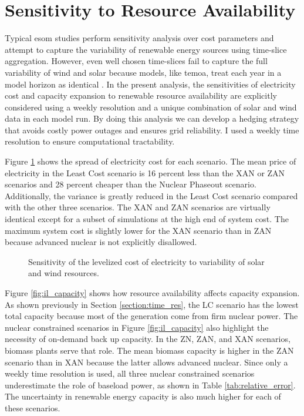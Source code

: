\section{Sensitivity to Resource Availability}
\label{section:resource_sa}

Typical \gls{esom} studies perform sensitivity analysis over cost parameters and
attempt to capture the variability of renewable energy sources using time-slice
aggregation. However, even well chosen time-slices fail to capture the full variability
of wind and solar because models, like \gls{temoa}, treat each year in a model
horizon as identical \cite{hunter_modeling_2013}. In the present analysis, the
sensitivities of electricity cost and capacity expansion to renewable resource
availability are explicitly considered using a weekly resolution and a unique combination
of solar and wind data in each model run. By doing this analysis we can develop
a hedging strategy that avoids costly power outages and ensures grid reliability.
I used a weekly time resolution to ensure computational tractability.

Figure \ref{fig:obj_cost_plot} shows the spread of electricity cost for each scenario.
The mean price of electricity in the Least Cost scenario is 16 percent less than
the XAN or ZAN scenarios and 28 percent cheaper than the Nuclear Phaseout scenario.
Additionally, the variance is greatly reduced in the Least Cost scenario compared
with the other three scenarios. The XAN and ZAN scenarios are virtually identical
except for a subset of simulations at the high end of system cost. The maximum
system cost is slightly lower for the XAN scenario than in ZAN because advanced
nuclear is not explicitly disallowed.

\begin{figure}[H]
  \centering
  \resizebox{0.95\columnwidth}{!}{}
  \caption{Sensitivity of the levelized cost of electricity to variability of
   solar and wind resources.}
  \label{fig:obj_cost_plot}
\end{figure}

Figure \ref{fig:il_capacity} shows how resource availability affects capacity
expansion. As shown previously in Section \ref{section:time_res}, the LC scenario
has the lowest total capacity because most of the generation come from firm nuclear
power. The nuclear constrained scenarios in Figure \ref{fig:il_capacity} also
highlight the necessity of on-demand back up capacity. In the ZN, ZAN, and XAN
scenarios, biomass plants serve that role. The mean biomass capacity is higher
in the ZAN scenario than in XAN because the latter allows advanced nuclear. Since
only a weekly time resolution is used, all three nuclear constrained scenarios
underestimate the role of baseload power, as shown in Table \ref{tab:relative_error}.
The uncertainty in renewable energy capacity is also much higher for each of these scenarios.


